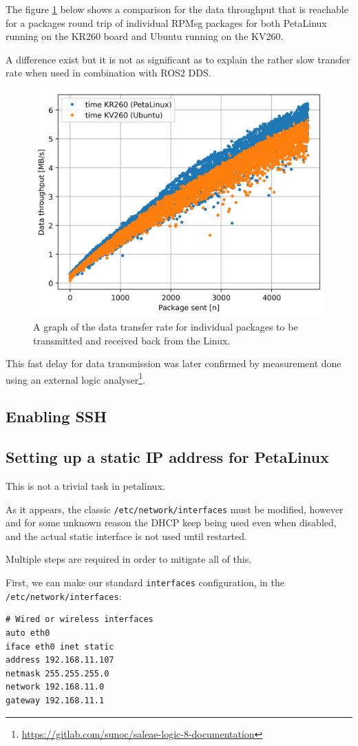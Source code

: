 \documentclass[10pt]{article}
\begin{document}
The figure \ref{fig:org9f5f4c2} below shows a comparison for the data
throughput that is reachable for a packages round trip of individual RPMsg
packages for both PetaLinux running on the KR260 board and Ubuntu running on the
KV260.

A difference exist but it is not as significant as to explain the rather slow
transfer rate when used in combination with ROS2 DDS.

\begin{figure}[htbp]
\centering
\includegraphics[width=.6\textwidth]{./img/kr260_echo_test_density.png}
\caption{\label{fig:org9f5f4c2}A graph of the data transfer rate for individual packages to be transmitted and received back from the Linux.}
\end{figure}

This fast delay for data transmission was later confirmed by measurement done using an external logic analyser\footnote{\url{https://gitlab.com/sunoc/saleae-logic-8-documentation}}.

\subsection{Enabling SSH}
\label{sec:orgc4335af}
\subsection{Setting up a static IP address for PetaLinux}
\label{sec:org87359c6}
This is not a trivial task in petalinux.

As it appears, the classic \texttt{/etc/network/interfaces} must be modified, however and
for some unknown reason the DHCP keep being used even when disabled, and the
actual static interface is not used until restarted.

Multiple steps are required in order to mitigate all of this.

First, we can make our standard \texttt{interfaces} configuration, in the  \texttt{/etc/network/interfaces}:
\begin{verbatim}
# Wired or wireless interfaces
auto eth0
iface eth0 inet static
address 192.168.11.107
netmask 255.255.255.0
network 192.168.11.0
gateway 192.168.11.1
\end{verbatim}
\end{document}
